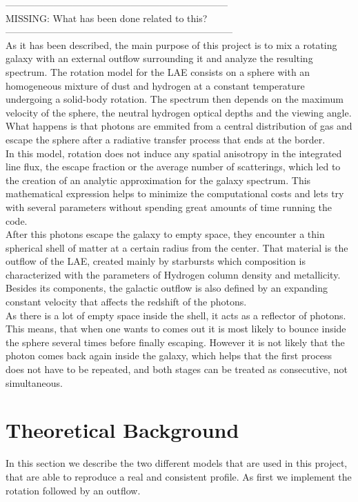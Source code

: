 \documentclass{latex/emulateapj}
\begin{document}
---------------------------------------------------------------------\\
MISSING: What has been done related to this?\\
-----------------------------------------------------------------------\\

As it has been described, the main purpose of this project is to mix a rotating galaxy with an external outflow surrounding it and analyze the resulting spectrum. The rotation model for the LAE consists on a sphere with an homogeneous mixture of dust and hydrogen at a constant temperature undergoing a solid-body rotation. The spectrum then depends on the maximum velocity of the sphere, the neutral hydrogen optical depths and the viewing angle. What happens is that photons are emmited from a central distribution of gas and escape the sphere after a radiative transfer process that ends at the border.\\

In this model, rotation does not induce any spatial anisotropy in the integrated line flux, the escape fraction or the average number of scatterings, which led to the creation of an analytic approximation for the galaxy spectrum. This mathematical expression helps to minimize the computational costs and lets try with several parameters without spending great amounts of time running the code. \\

After this photons escape the galaxy to empty space, they encounter a thin spherical shell of matter at a certain radius from the center. That material is the outflow of the LAE, created mainly by starbursts which composition is characterized with the parameters of Hydrogen column density and metallicity. Besides its components, the galactic outflow is also defined by an expanding constant velocity that affects the redshift of the photons.\\

As there is a lot of empty space inside the shell, it acts as a reflector of photons. This means, that when one wants to comes out it is most likely to bounce inside the sphere several times before finally escaping. However it is not likely that the photon comes back again inside the galaxy, which helps that the first process does not have to be repeated, and both stages can be treated as consecutive, not simultaneous. \\


\section{Theoretical Background}
\label{sec:theo}
In this section we describe the two different models that are used in this project,
that are able to reproduce a real and consistent \lya profile. As first we implement
the rotation followed by an outflow.\\
\end{document}
